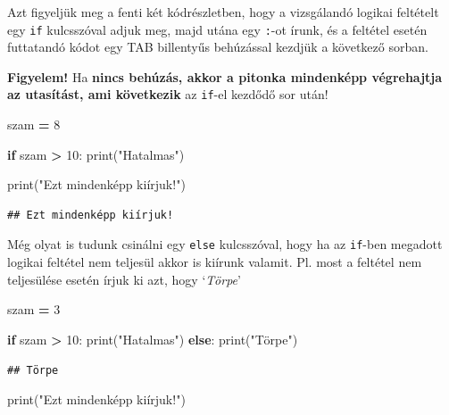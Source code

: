 \documentclass[
]{book}
\newenvironment{Shaded}{\begin{snugshade}}{\end{snugshade}}
\newcommand{\BuiltInTok}[1]{#1}
\newcommand{\ControlFlowTok}[1]{\textcolor[rgb]{0.13,0.29,0.53}{\textbf{#1}}}
\newcommand{\DecValTok}[1]{\textcolor[rgb]{0.00,0.00,0.81}{#1}}
\newcommand{\NormalTok}[1]{#1}
\newcommand{\OperatorTok}[1]{\textcolor[rgb]{0.81,0.36,0.00}{\textbf{#1}}}
\newcommand{\StringTok}[1]{\textcolor[rgb]{0.31,0.60,0.02}{#1}}
\begin{document}
Azt figyeljük meg a fenti két kódrészletben, hogy a vizsgálandó logikai feltételt egy \texttt{if} kulcsszóval adjuk meg, majd utána egy \texttt{:}-ot írunk, és a feltétel esetén futtatandó kódot egy TAB billentyűs behúzással kezdjük a következő sorban.

\textbf{Figyelem!} Ha \textbf{nincs behúzás, akkor a pitonka mindenképp végrehajtja az utasítást, ami következik} az \texttt{if}-el kezdődő sor után!

\begin{Shaded}
\begin{Highlighting}[]
\NormalTok{szam }\OperatorTok{=} \DecValTok{8}

\ControlFlowTok{if}\NormalTok{ szam }\OperatorTok{\textgreater{}} \DecValTok{10}\NormalTok{:}
  \BuiltInTok{print}\NormalTok{(}\StringTok{"Hatalmas"}\NormalTok{)}

\BuiltInTok{print}\NormalTok{(}\StringTok{"Ezt mindenképp kiírjuk!"}\NormalTok{)}
\end{Highlighting}
\end{Shaded}

\begin{verbatim}
## Ezt mindenképp kiírjuk!
\end{verbatim}

Még olyat is tudunk csinálni egy \texttt{else} kulcsszóval, hogy ha az \texttt{if}-ben megadott logikai feltétel nem teljesül akkor is kiírunk valamit. Pl. most a feltétel nem teljesülése esetén írjuk ki azt, hogy `\emph{Törpe}'

\begin{Shaded}
\begin{Highlighting}[]
\NormalTok{szam }\OperatorTok{=} \DecValTok{3}

\ControlFlowTok{if}\NormalTok{ szam }\OperatorTok{\textgreater{}} \DecValTok{10}\NormalTok{:}
  \BuiltInTok{print}\NormalTok{(}\StringTok{"Hatalmas"}\NormalTok{)}
\ControlFlowTok{else}\NormalTok{:}
  \BuiltInTok{print}\NormalTok{(}\StringTok{"Törpe"}\NormalTok{)}
\end{Highlighting}
\end{Shaded}

\begin{verbatim}
## Törpe
\end{verbatim}

\begin{Shaded}
\begin{Highlighting}[]
\BuiltInTok{print}\NormalTok{(}\StringTok{"Ezt mindenképp kiírjuk!"}\NormalTok{)}
\end{Highlighting}
\end{Shaded}
\end{document}
